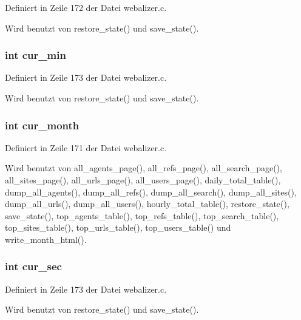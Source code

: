Definiert in Zeile 172 der Datei webalizer.c.

Wird benutzt von restore\_\-state() und save\_\-state().
\subsubsection{\setlength{\rightskip}{0pt plus 5cm}int {\bf cur\_\-min}}\label{webalizer_8h_726c08db04038ffbeffd72a3181ac519}




Definiert in Zeile 173 der Datei webalizer.c.

Wird benutzt von restore\_\-state() und save\_\-state().
\subsubsection{\setlength{\rightskip}{0pt plus 5cm}int {\bf cur\_\-month}}\label{webalizer_8h_d8ec6498bcc8d8eb82d92bc5c1aacc8d}




Definiert in Zeile 171 der Datei webalizer.c.

Wird benutzt von all\_\-agents\_\-page(), all\_\-refs\_\-page(), all\_\-search\_\-page(), all\_\-sites\_\-page(), all\_\-urls\_\-page(), all\_\-users\_\-page(), daily\_\-total\_\-table(), dump\_\-all\_\-agents(), dump\_\-all\_\-refs(), dump\_\-all\_\-search(), dump\_\-all\_\-sites(), dump\_\-all\_\-urls(), dump\_\-all\_\-users(), hourly\_\-total\_\-table(), restore\_\-state(), save\_\-state(), top\_\-agents\_\-table(), top\_\-refs\_\-table(), top\_\-search\_\-table(), top\_\-sites\_\-table(), top\_\-urls\_\-table(), top\_\-users\_\-table() und write\_\-month\_\-html().
\subsubsection{\setlength{\rightskip}{0pt plus 5cm}int {\bf cur\_\-sec}}\label{webalizer_8h_a2131c365f9da2fb93a57aed95b563d8}




Definiert in Zeile 173 der Datei webalizer.c.

Wird benutzt von restore\_\-state() und save\_\-state().
